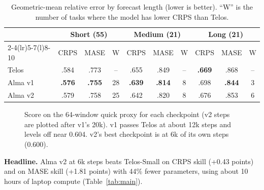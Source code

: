 \documentclass[10pt,twocolumn]{extarticle}
\newcommand{\best}[1]{\textbf{#1}}
\begin{document}
\begin{table}[t]
\centering\small
\caption{Geometric-mean relative error by forecast length (lower is better).
``W'' is the number of tasks where the model has lower CRPS than Telos.}
\label{tab:term}
\setlength{\tabcolsep}{2.6pt}
\begin{tabular}{@{}lccccccccc@{}}
\toprule
 & \multicolumn{3}{c}{Short (55)} & \multicolumn{3}{c}{Medium (21)} & \multicolumn{3}{c}{Long (21)} \\
\cmidrule(lr){2-4}\cmidrule(lr){5-7}\cmidrule(l){8-10}
 & CRPS & MASE & W & CRPS & MASE & W & CRPS & MASE & W \\
\midrule
Telos    & .584 & .773 & -- & .655 & .849 & -- & \best{.669} & .868 & -- \\
Alma v1  & \best{.576} & \best{.755} & 28 & \best{.639} & \best{.814} & 8 & .698 & \best{.844} & 3 \\
Alma v2  & .579 & .758 & 25 & .642 & .820 & 8 & .676 & .853 & 6 \\
\bottomrule
\end{tabular}
\end{table}

\begin{figure}[t]
\centering
{}
\caption{Score on the 64-window quick proxy for each checkpoint (v2 steps are
plotted after v1's 20k). v1 passes Telos at about 12k steps and levels off near
0.604. v2's best checkpoint is at 6k of its own steps (0.600).}
\label{fig:curve}
\end{figure}

\textbf{Headline.} Alma v2 at 6k steps beats Telos-Small on CRPS skill
(+0.43 points) and on MASE skill (+1.81 points) with 44\% fewer parameters, using
about 10 hours of laptop compute (Table~\ref{tab:main}).
\end{document}
